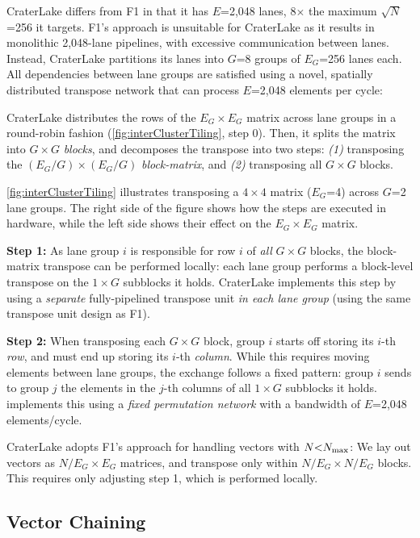 CraterLake differs from F1 in that it has $E$=2,048 lanes, 8$\times$ the
maximum $\sqrt{N}$=256 it targets. F1's approach is unsuitable for CraterLake
as it results in monolithic 2,048-lane pipelines, with excessive communication
between lanes. Instead, CraterLake partitions its lanes into $G$=8 groups of
$E_G$=256 lanes each. All dependencies between lane groups are satisfied using
a novel, spatially distributed transpose network that can process $E$=2,048
elements per cycle:

\figInterClusterTiling

CraterLake distributes the rows of the $E_G\times E_G$ matrix across lane
groups in a round-robin fashion (\autoref{fig:interClusterTiling}, step 0).
Then, it splits the matrix into $G \times G$ \emph{blocks}, and decomposes the
transpose into two steps: \emph{(1)} transposing the $(E_G/G) \times (E_G/G)$
\emph{block-matrix}, and \emph{(2)} transposing all $G\times G$ blocks.

\autoref{fig:interClusterTiling} illustrates transposing a $4\times 4$ matrix
($E_G$=4) across $G$=2 lane groups. The right side of the figure shows how the
steps are executed in hardware, while the left side shows their effect on the
$E_G\times E_G$ matrix.

\textbf{Step 1:} As lane group $i$ is responsible for row $i$ of \emph{all} $G
\times G$ blocks, the block-matrix transpose can be performed locally: each
lane group performs a block-level transpose on the $1 \times G$ subblocks it
holds. CraterLake implements this step by using a \emph{separate} fully-pipelined
transpose unit \emph{in each lane group} (using the same transpose unit design
as F1).

\textbf{Step 2:} When transposing each $G \times G$ block, group $i$ starts off
storing its $i$-th \emph{row}, and must end up storing its $i$-th
\emph{column}. While this requires moving elements between lane groups, the
exchange follows a fixed pattern: group $i$ sends to group $j$ the elements in
the $j$-th columns of all $1 \times G$ subblocks it holds. \name implements
this using a \emph{fixed permutation network} with a bandwidth of $E$=2,048
elements/cycle.

CraterLake adopts F1's approach for handling vectors with $N{<}N_{\textrm{max}}$: We lay
out vectors as $N/E_G \times E_G$ matrices, and transpose only within $N/E_G
\times N/E_G$ blocks. This requires only adjusting step 1, which is performed
locally.


\subsection{Vector Chaining}\label{sec:keyswitchingPipeline}

